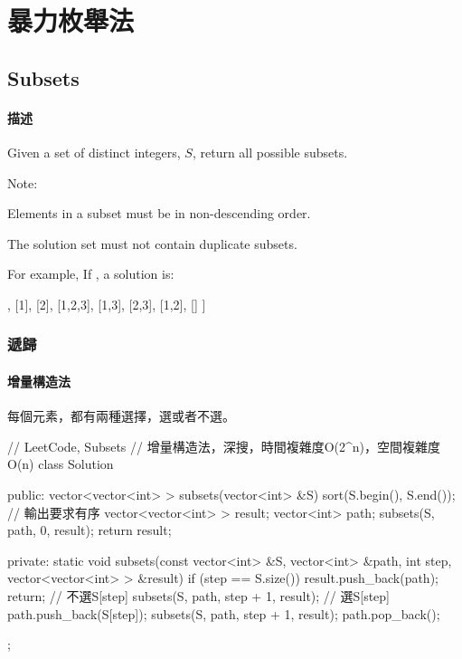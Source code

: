 \chapter{暴力枚舉法}


\section{Subsets} %
\label{sec:subsets}


\subsubsection{描述}
Given a set of distinct integers, $S$, return all possible subsets.

Note:
\begindot
\item Elements in a subset must be in non-descending order.
\item The solution set must not contain duplicate subsets.
\myenddot

For example, If , a solution is:
\begin{Code}
[
  [3],
  [1],
  [2],
  [1,2,3],
  [1,3],
  [2,3],
  [1,2],
  []
]
\end{Code}


\subsection{遞歸}


\subsubsection{增量構造法}
每個元素，都有兩種選擇，選或者不選。

\begin{Code}
// LeetCode, Subsets
// 增量構造法，深搜，時間複雜度O(2^n)，空間複雜度O(n)
class Solution {
public:
    vector<vector<int> > subsets(vector<int> &S) {
        sort(S.begin(), S.end());  // 輸出要求有序
        vector<vector<int> > result;
        vector<int> path;
        subsets(S, path, 0, result);
        return result;
    }

private:
    static void subsets(const vector<int> &S, vector<int> &path, int step,
            vector<vector<int> > &result) {
        if (step == S.size()) {
            result.push_back(path);
            return;
        }
        // 不選S[step]
        subsets(S, path, step + 1, result);
        // 選S[step]
        path.push_back(S[step]);
        subsets(S, path, step + 1, result);
        path.pop_back();
    }
};
\end{Code}


